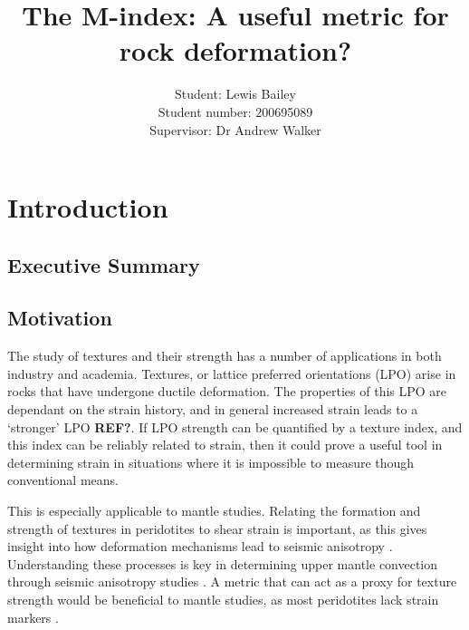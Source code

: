 \documentclass[a4paper,12pt]{report}
\title{\textbf{The M-index: A useful metric for rock deformation?}}
\author{Student: Lewis Bailey\\Student number: 200695089\\Supervisor: Dr Andrew Walker}
\date{}
\numberwithin{equation}{chapter}
\begin{document}
\maketitle

\tableofcontents

\listoffigures

\chapter{Introduction} \label{chap:intro}
\vspace{-1cm}

\section{Executive Summary} \label{sec:summary}

\section{Motivation} \label{sec:motivation}
The study of textures and their strength has a number of applications in both industry and academia. Textures, or lattice preferred orientations (LPO) arise in rocks that have undergone ductile deformation. The properties of this LPO are dependant on the strain history, and in general increased strain leads to a \lq{}stronger\rq{} LPO \textbf{REF?}. If LPO strength can be quantified by a texture index, and this index can be reliably related to strain, then it could prove a useful tool in determining strain in situations where it is impossible to measure though conventional means.

This is especially applicable to mantle studies. Relating the formation and strength of textures in peridotites to shear strain is important, as this gives insight into how deformation mechanisms lead to seismic anisotropy \citep{Warren2008}. Understanding these processes is key in determining upper mantle convection through seismic anisotropy studies \citep[e.g.][]{Blackman2002}. A metric that can act as a proxy for texture strength would be beneficial to mantle studies, as most peridotites lack strain markers \citep{Tommasi2000}.
\end{document}
